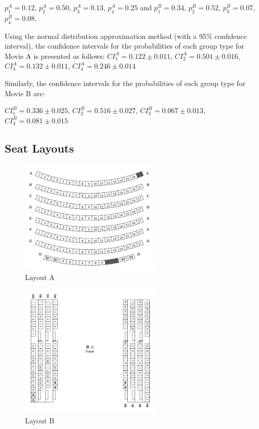 $p_1^{A} =  0.12$, $p_2^{A} =  0.50$, $p_3^{A} = 0.13$, $p_4^{A} = 0.25$ and $p_1^{B} =  0.34$, $p_2^{B} =  0.52$, $p_3^{B} = 0.07$, $p_4^{B} = 0.08$.


Using the normal distribution approximation method (with a 95\% confidence interval), the confidence intervals for the probabilities of each group type for Movie A is presented as follows:
$CI_1^{A} =  0.122 \pm 0.011$, $CI_2^{A} =  0.501 \pm 0.016$, $CI_3^{A} = 0.132 \pm 0.011$, $CI_4^{A} = 0.246 \pm 0.014$

Similarly, the confidence intervals for the probabilities of each group type for Movie B are:

$CI_1^{B} =  0.336 \pm 0.025$, $CI_2^{B} =  0.516 \pm 0.027$, $CI_3^{B} = 0.067 \pm 0.013$, $CI_4^{B} = 0.081 \pm 0.015$




\subsection{Seat Layouts}

\begin{figure}[h]
    \centering
      \includegraphics[width=0.6\textwidth]{./Figures/Layouts/Layout_A.png}
    \caption{Layout A}
\end{figure}
  
\begin{figure}[h]
    \centering
      \includegraphics[width=0.6\textwidth]{./Figures/Layouts/Layout_B.png}
    \caption{Layout B}
\end{figure}

